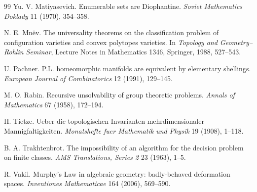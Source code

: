 \documentclass[11pt]{article}
\begin{document}
\begin{thebibliography}{99}
Yu. V. Matiyasevich.
\newblock Enumerable sets are Diophantine.
\newblock \emph{Soviet Mathematics Doklady} 11 (1970), 354--358.

N. E. Mnëv.
\newblock The universality theorems on the classification problem of configuration varieties and convex polytopes varieties.
\newblock In \emph{Topology and Geometry--Rohlin Seminar}, Lecture Notes in Mathematics 1346, Springer, 1988, 527--543.

U. Pachner.
\newblock P.L. homeomorphic manifolds are equivalent by elementary shellings.
\newblock \emph{European Journal of Combinatorics} 12 (1991), 129--145.

M. O. Rabin.
\newblock Recursive unsolvability of group theoretic problems.
\newblock \emph{Annals of Mathematics} 67 (1958), 172--194.

H. Tietze.
\newblock Ueber die topologischen Invarianten mehrdimensionaler Mannigfaltigkeiten.
\newblock \emph{Monatshefte fuer Mathematik und Physik} 19 (1908), 1--118.

B. A. Trakhtenbrot.
\newblock The impossibility of an algorithm for the decision problem on finite classes.
\newblock \emph{AMS Translations, Series 2} 23 (1963), 1--5.

R. Vakil.
\newblock Murphy's Law in algebraic geometry: badly-behaved deformation spaces.
\newblock \emph{Inventiones Mathematicae} 164 (2006), 569--590.

\end{thebibliography}
\end{document}
